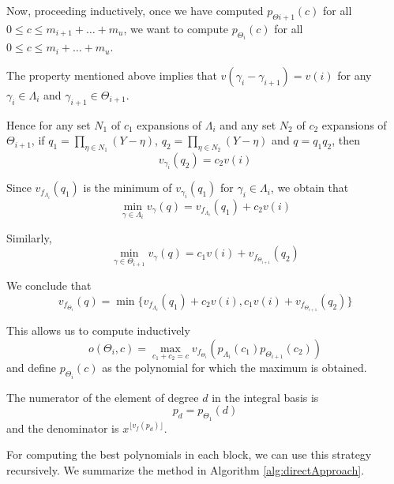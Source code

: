 \documentclass[a4paper,11pt]{amsart}%
\theoremstyle{definition}
\theoremstyle{plain}
\theoremstyle{remark}
\begin{document}
Now, proceeding inductively, once we have computed $p_{\varTheta{i+1}}(c)$ for
all $0 \leq c \leq m_{i+1} + \dots+ m_{u}$, we want to compute
$p_{\varTheta_{i}}(c)$ for all $0 \leq c \leq m_{i} + \dots+ m_{u}$.

The property mentioned above implies that $v(\gamma_{i} - \gamma_{i+1}) =
v(i)$ for any $\gamma_{i} \in\varLambda_{i}$ and $\gamma_{i+1} \in
\varTheta_{i+1}$.

Hence for any set $N_{1}$ of $c_{1}$ expansions of $\varLambda_{i}$ and any
set $N_{2}$ of $c_{2}$ expansions of $\varTheta_{i+1}$, if $q_{1} =
\prod_{\eta\in N_{1}}(Y - \eta)$, $q_{2} = \prod_{\eta\in N_{2}}(Y - \eta)$
and $q = q_{1}q_{2}$, then
\[
v_{\gamma_{i}}(q_{2}) = c_{2} v(i)
\]


Since $v_{f_{\varLambda_{i}}}(q_{1})$ is the minimum of $v_{\gamma_{i}}%
(q_{1})$ for $\gamma_{i} \in\varLambda_{i}$, we obtain that
\[
\min_{\gamma\in\varLambda_{i}} v_{\gamma}(q) = v_{f_{\varLambda_{i}}}(q_{1}) +
c_{2} v(i)
\]


Similarly,
\[
\min_{\gamma\in\varTheta_{i+1}} v_{\gamma}(q) = c_{1} v(i) +
v_{f_{\varTheta_{i+1}}}(q_{2})
\]


We conclude that
\[
v_{f_{\varTheta_{i}}}(q) = \min\{v_{f_{\varLambda_{i}}}(q_{1}) + c_{2} v(i),
c_{1} v(i) + v_{f_{\varTheta_{i+1}}}(q_{2})\}
\]


This allows us to compute inductively
\[
o(\varTheta_{i}, c) = \max_{c_{1} + c_{2} = c} v_{f_{\varTheta_{i}}%
}(p_{\varLambda_{i}}(c_{1})p_{\varTheta_{i+1}}(c_{2}))
\]
and define $p_{\varTheta_{i}}(c)$ as the polynomial for which the maximum is obtained.

The numerator of the element of degree $d$ in the integral basis is
\[
p_{d} = p_{\varTheta_{1}}(d)
\]
and the denominator is $x^{\lfloor v_{f}(p_{d}) \rfloor}$.

For computing the best polynomials in each block, we can use this strategy
recursively. We summarize the method in Algorithm \ref{alg:directApproach}.
\end{document}
